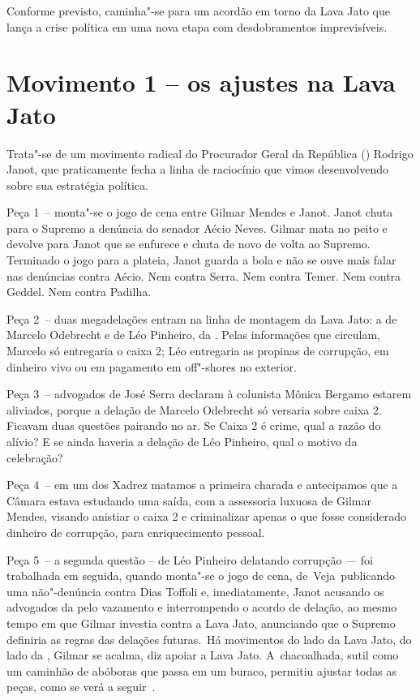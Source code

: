  

Conforme previsto, caminha"-se para um acordão em torno da Lava Jato que
lança a crise política em uma nova etapa com desdobramentos
imprevisíveis.

\section{Movimento 1 -- os ajustes na Lava Jato}

Trata"-se de um movimento radical do Procurador Geral da República ()
Rodrigo Janot, que praticamente fecha a linha de raciocínio que vimos
desenvolvendo sobre sua estratégia política.

Peça 1~-- monta"-se o jogo de cena entre Gilmar Mendes e Janot. Janot
chuta para o Supremo a denúncia do senador Aécio Neves. Gilmar mata no
peito e devolve para Janot que se enfurece e chuta de novo de volta ao
Supremo. Terminado o jogo para a plateia, Janot guarda a bola e não se
ouve mais falar nas denúncias contra Aécio. Nem contra Serra. Nem contra
Temer. Nem contra Geddel. Nem contra Padilha.

Peça 2~-- duas megadelações entram na linha de montagem da Lava Jato: a
de Marcelo Odebrecht e de Léo Pinheiro, da . Pelas informações que
circulam, Marcelo só entregaria o caixa 2; Léo entregaria as propinas de
corrupção, em dinheiro vivo ou em pagamento em off"-shores no exterior.

Peça 3~-- advogados de José Serra declaram à colunista Mônica Bergamo
estarem aliviados, porque a delação de Marcelo Odebrecht só versaria
sobre caixa 2. Ficavam duas questões pairando no ar. Se Caixa 2 é crime,
qual a razão do alívio? E se ainda haveria a delação de Léo Pinheiro,
qual o motivo da celebração?

Peça 4~-- em um dos Xadrez matamos a primeira charada e antecipamos que
a Câmara estava estudando uma saída, com a assessoria luxuosa de Gilmar
Mendes, visando anistiar o caixa 2 e criminalizar apenas o que fosse
considerado dinheiro de corrupção, para enriquecimento pessoal.

Peça 5~-- a segunda questão -- de Léo Pinheiro delatando corrupção ---
foi trabalhada em seguida, quando monta"-se o jogo de cena,
de~Veja~publicando uma não"-denúncia contra Dias Toffoli e,
imediatamente, Janot acusando os advogados da  pelo vazamento e
interrompendo o acordo de delação, ao mesmo tempo em que Gilmar investia
contra a Lava Jato, anunciando que o Supremo definiria as regras das
delações futuras.~Há movimentos do lado da Lava Jato, do lado da ,
Gilmar se acalma, diz apoiar a Lava Jato. A~chacoalhada, sutil como um
caminhão de abóboras que passa em um buraco, permitiu ajustar todas as
peças, como se verá a seguir~.

